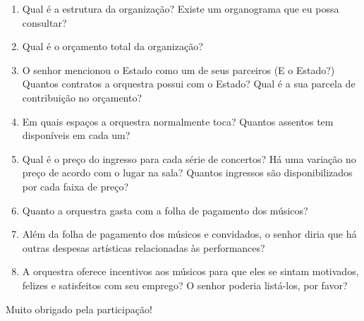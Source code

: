 \documentclass[a4paper, 12pt, openright, oneside, german, french, english, brazil]{abntex2}
\begin{document}
\begin{enumerate}
		\item Qual é a estrutura da organização? Existe um organograma que eu possa consultar?
		
		
		\item Qual é o orçamento total da organização?
		
		
		\item O senhor mencionou o Estado como um de seus parceiros (E o Estado?) Quantos contratos a orquestra possui com o Estado? Qual é a sua parcela de contribuição no orçamento?
		
		

		
		\item Em quais espaços a orquestra normalmente toca? Quantos assentos tem disponíveis em cada um?
		
		\item Qual é o preço do ingresso para cada série de concertos? Há uma variação no preço de acordo com o lugar na sala? Quantos ingressos são disponibilizados por cada faixa de preço?
		
		\item Quanto a orquestra gasta com a folha de pagamento dos músicos?
		
		\item Além da folha de pagamento dos músicos e convidados, o senhor diria que há outras despesas artísticas relacionadas às performances?
		
		\item A orquestra oferece incentivos aos músicos para que eles se sintam motivados, felizes e satisfeitos com seu emprego? O senhor poderia listá-los, por favor?
		
	\end{enumerate}
	
	Muito obrigado pela participação!
\end{document}
